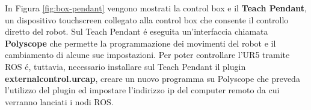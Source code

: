 In Figura \ref{fig:box-pendant} vengono mostrati la control box e il \textbf{Teach Pendant}, un dispositivo touchscreen collegato 
alla control box che consente il controllo diretto del robot. Sul Teach Pendant \'{e} eseguita un'interfaccia chiamata \textbf{Polyscope} 
che permette la programmazione dei movimenti del robot e il cambiamento di alcune sue impostazioni. 
Per poter controllare l'UR5 tramite ROS \'{e}, tuttavia, necessario installare sul Teach Pendant il plugin \textbf{externalcontrol.urcap}, 
creare un nuovo programma su Polyscope che preveda l'utilizzo del plugin ed impostare l'indirizzo ip del computer remoto da cui 
verranno lanciati i nodi ROS.
